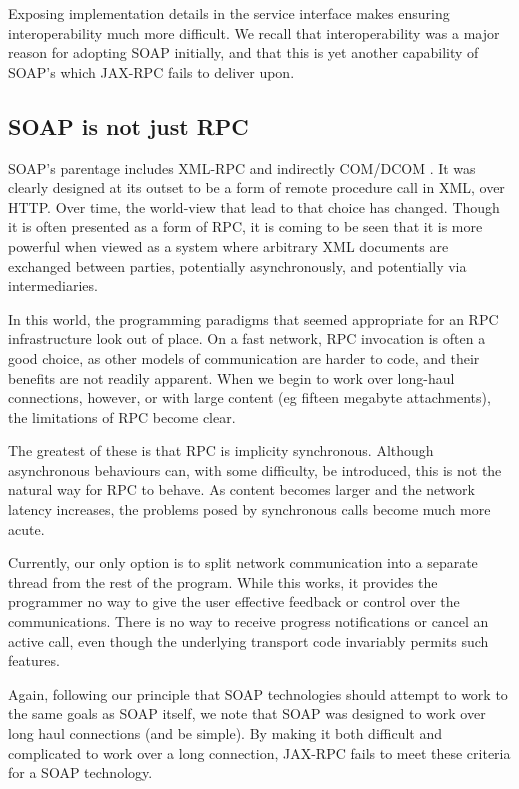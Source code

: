 
Exposing implementation details in the service interface makes ensuring
interoperability much more difficult. We recall that interoperability
was a major reason for adopting SOAP initially, and that this is yet
another capability of SOAP's which JAX-RPC fails to deliver upon.

\subsection{SOAP is not just RPC}
\label{objections:soap-not-just-rmi}

SOAP's parentage includes XML-RPC \cite{winer:xmlrpc} and indirectly
COM/DCOM \cite{dbox:com}. It was clearly designed at its outset to be
a form of remote procedure call in XML, over HTTP. Over time, the
world-view that lead to that choice has changed. Though it is often
presented as a form of RPC, it is coming to be seen that it is more
powerful when viewed as a system where arbitrary XML documents are
exchanged between parties, potentially asynchronously, and potentially
via intermediaries.

In this world, the programming paradigms that seemed appropriate for
an RPC infrastructure look out of place. On a fast network, RPC
invocation is often a good choice, as other models of communication
are harder to code, and their benefits are not readily apparent. When
we begin to work over long-haul connections, however, or with large
content (eg fifteen megabyte attachments), the limitations of RPC
become clear.

The greatest of these is that RPC is implicity synchronous. Although
asynchronous behaviours can, with some difficulty, be introduced, this
is not the natural way for RPC to behave. As content becomes larger
and the network latency increases, the problems posed by synchronous
calls become much more acute.

Currently, our only option is to split network communication into a
separate thread from the rest of the program. While this works, it
provides the programmer no way to give the user effective feedback or
control over the communications. There is no way to receive progress
notifications or cancel an active call, even though the underlying
transport code invariably permits such features.

Again, following our principle that SOAP technologies should
attempt to work to the same goals as SOAP itself, we note that SOAP
was designed to work over long haul connections (and be simple). By
making it both difficult and complicated to work over a long
connection, JAX-RPC fails to meet these criteria for a SOAP
technology.


